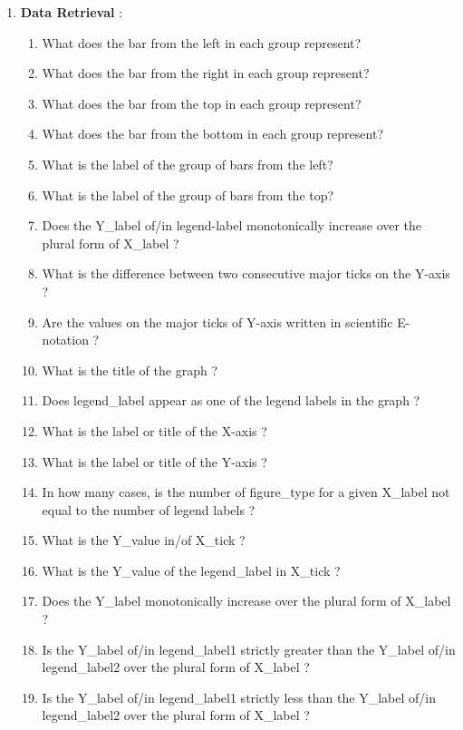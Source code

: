 \documentclass[10pt,twocolumn,letterpaper]{article}
\begin{document}
\begin{enumerate}
    \item \textbf{Data Retrieval} :
    \begin{enumerate}[1.]
        \item What does the  bar from the left in each group represent?
        \item What does the  bar from the right in each group represent?
        \item What does the  bar from the top in each group represent?
        \item What does the  bar from the bottom in each group represent?
        \item What is the label of the  group of bars from the left?
        \item What is the label of the  group of bars from the top?
        \item Does the Y\_label of/in legend-label monotonically increase over the plural form of X\_label ?
        \item What is the difference between two consecutive major ticks on the Y-axis ?
        \item Are the values on the major ticks of Y-axis written in scientific E-notation ?
        \item What is the title of the graph ?
        \item Does legend\_label appear as one of the legend labels in the graph ? 
        \item What is the label or title of the X-axis ?
        \item What is the label or title of the Y-axis ?
        \item In how many cases, is the number of figure\_type for a given X\_label not equal to the number of legend labels ?
        \item What is the Y\_value in/of  X\_tick ?
        \item What is the Y\_value of the  legend\_label in  X\_tick ?
        \item Does the Y\_label monotonically increase over the plural form of X\_label ?
        \item Is the Y\_label of/in legend\_label1 strictly greater than the Y\_label of/in legend\_label2 over the plural form of X\_label ?
        \item Is the Y\_label of/in legend\_label1 strictly less than the Y\_label of/in legend\_label2 over the plural form of X\_label ?
    \end{enumerate}
    

\end{enumerate}
\end{document}
